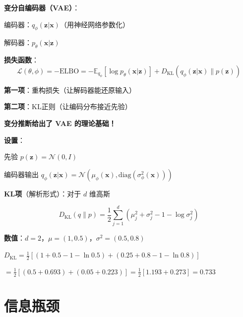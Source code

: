 \documentclass[12pt, a4paper]{ctexart}
\begin{document}
\begin{blackboard}[VAE损失函数的来源]

\textbf{变分自编码器（VAE）}：

编码器：$q_\phi(\mathbf{z} | \mathbf{x})$（用神经网络参数化）

解码器：$p_\theta(\mathbf{x} | \mathbf{z})$

\textbf{损失函数}：
\[
\mathcal{L}(\theta, \phi) = -\text{ELBO} = -\mathbb{E}_{q_\phi}[\log p_\theta(\mathbf{x} | \mathbf{z})] + D_{\text{KL}}(q_\phi(\mathbf{z} | \mathbf{x}) \| p(\mathbf{z}))
\]

\textbf{第一项}：重构损失（让解码器能还原输入）

\textbf{第二项}：KL正则（让编码分布接近先验）

\textbf{变分推断给出了 VAE 的理论基础！}

\end{blackboard}

\begin{blackboard}

\textbf{设置}：

先验 $p(\mathbf{z}) = \mathcal{N}(0, I)$

编码器输出 $q_\phi(\mathbf{z} | \mathbf{x}) = \mathcal{N}(\mu_\phi(\mathbf{x}), \text{diag}(\sigma^2_\phi(\mathbf{x})))$

\textbf{KL项}（解析形式）：对于 $d$ 维高斯

\[
D_{\text{KL}}(q \| p) = \frac{1}{2} \sum_{j=1}^d \left( \mu_j^2 + \sigma_j^2 - 1 - \log \sigma_j^2 \right)
\]

\textbf{数值}：$d = 2$，$\mu = (1, 0.5)$，$\sigma^2 = (0.5, 0.8)$

$D_{\text{KL}} = \frac{1}{2}[(1 + 0.5 - 1 - \ln 0.5) + (0.25 + 0.8 - 1 - \ln 0.8)]$

$= \frac{1}{2}[(0.5 + 0.693) + (0.05 + 0.223)] = \frac{1}{2}[1.193 + 0.273] = \mathbf{0.733}$

\end{blackboard}

\section{信息瓶颈}
\end{document}
